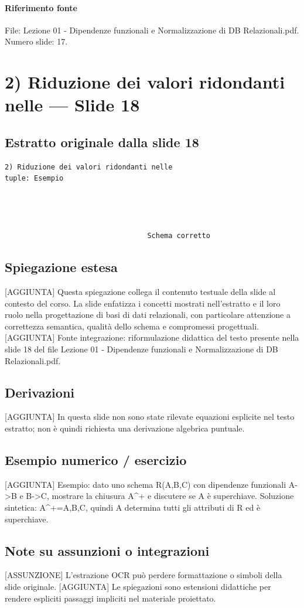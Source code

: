\documentclass[11pt]{article}
\begin{document}
\paragraph{Riferimento fonte} File: Lezione 01 - Dipendenze funzionali e Normalizzazione di DB Relazionali.pdf. Numero slide: 17.
\section{2) Riduzione dei valori ridondanti nelle --- Slide 18}
\subsection*{Estratto originale dalla slide 18}
\begin{lstlisting}
2) Riduzione dei valori ridondanti nelle
tuple: Esempio




                                  Schema corretto
\end{lstlisting}
\subsection*{Spiegazione estesa}
[AGGIUNTA] Questa spiegazione collega il contenuto testuale della slide al contesto del corso. La slide enfatizza i concetti mostrati nell'estratto e il loro ruolo nella progettazione di basi di dati relazionali, con particolare attenzione a correttezza semantica, qualità dello schema e compromessi progettuali.
[AGGIUNTA] Fonte integrazione: riformulazione didattica del testo presente nella slide 18 del file Lezione 01 - Dipendenze funzionali e Normalizzazione di DB Relazionali.pdf.
\subsection*{Derivazioni}
[AGGIUNTA] In questa slide non sono state rilevate equazioni esplicite nel testo estratto; non è quindi richiesta una derivazione algebrica puntuale.
\subsection*{Esempio numerico / esercizio}
[AGGIUNTA] Esempio: dato uno schema R(A,B,C) con dipendenze funzionali A->B e B->C, mostrare la chiusura A^+ e discutere se A è superchiave. Soluzione sintetica: A^+={A,B,C}, quindi A determina tutti gli attributi di R ed è superchiave.
\subsection*{Note su assunzioni o integrazioni}
[ASSUNZIONE] L'estrazione OCR può perdere formattazione o simboli della slide originale.
[AGGIUNTA] Le spiegazioni sono estensioni didattiche per rendere espliciti passaggi impliciti nel materiale proiettato.
\end{document}
